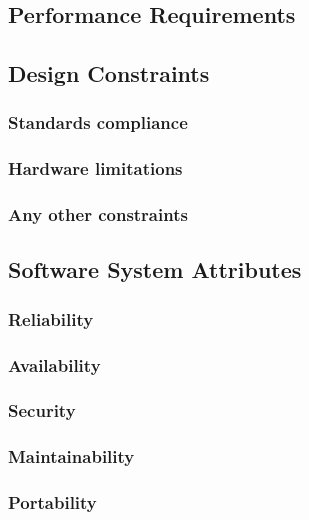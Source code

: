 % 


\subsection{Performance Requirements}
\subsection{Design Constraints}
\subsubsection{Standards compliance}
\subsubsection{Hardware limitations}
\subsubsection{Any other constraints}
\subsection{Software System Attributes}
\subsubsection{Reliability}
\subsubsection{Availability}
\subsubsection{Security}
\subsubsection{Maintainability}
\subsubsection{Portability}